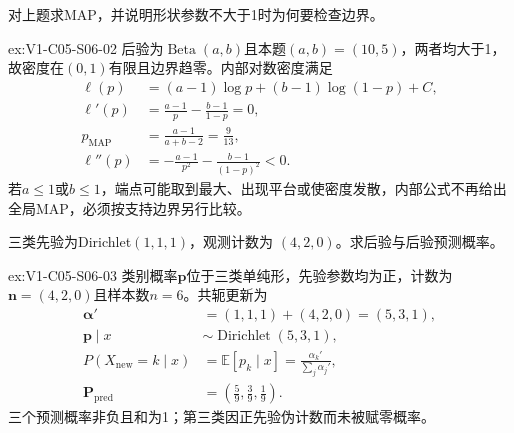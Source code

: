 \begin{SLChapterExercisePairSection}
\begin{exercise}\label{ex:V1-C05-S06-02}
对上题求MAP，并说明形状参数不大于1时为何要检查边界。
\end{exercise}
\label{sol:V1-C05-S06-02}
\begin{chapterexercisesolution}{ex:V1-C05-S06-02}
后验为$\operatorname{Beta}(a,b)$且本题$(a,b)=(10,5)$，两者均大于1，故密度在$(0,1)$有限且边界趋零。内部对数密度满足
\[
\begin{aligned}
\ell(p)&=(a-1)\log p+(b-1)\log(1-p)+C,\\
\ell'(p)&=\frac{a-1}{p}-\frac{b-1}{1-p}=0,\\
p_{\mathrm{MAP}}
&=\frac{a-1}{a+b-2}
=\frac9{13},\\
\ell''(p)&=-\frac{a-1}{p^2}-\frac{b-1}{(1-p)^2}<0.
\end{aligned}
\]
若$a\le1$或$b\le1$，端点可能取到最大、出现平台或使密度发散，内部公式不再给出全局MAP，必须按支持边界另行比较。
\end{chapterexercisesolution}

\begin{exercise}\label{ex:V1-C05-S06-03}
三类先验为Dirichlet$(1,1,1)$，观测计数为 $(4,2,0)$。求后验与后验预测概率。
\end{exercise}
\label{sol:V1-C05-S06-03}
\begin{chapterexercisesolution}{ex:V1-C05-S06-03}
类别概率$\boldsymbol p$位于三类单纯形，先验参数均为正，计数为$\boldsymbol n=(4,2,0)$且样本数$n=6$。共轭更新为
\[
\begin{aligned}
\boldsymbol\alpha'&=(1,1,1)+(4,2,0)=(5,3,1),\\
\boldsymbol p\mid x&\sim\operatorname{Dirichlet}(5,3,1),\\
P(X_{\mathrm{new}}=k\mid x)
&=\mathbb E[p_k\mid x]
=\frac{\alpha_k'}{\sum_j\alpha_j'},\\
\boldsymbol P_{\mathrm{pred}}
&=\left(\frac59,\frac39,\frac19\right).
\end{aligned}
\]
三个预测概率非负且和为1；第三类因正先验伪计数而未被赋零概率。
\end{chapterexercisesolution}


\end{SLChapterExercisePairSection}
